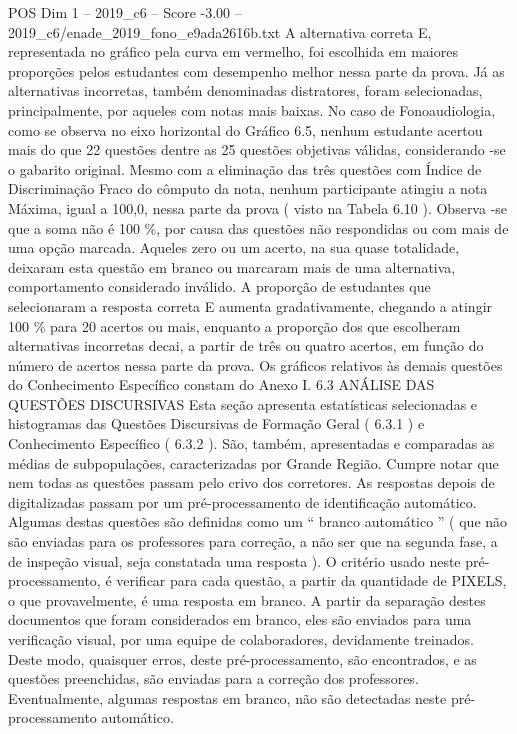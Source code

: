 \begin{textsample}{POS Dim 1 – 2019\_c6 – Score -3.00 – 2019\_c6/enade\_2019\_fono\_e9ada2616b.txt}
A alternativa correta E, representada no gráfico pela curva em vermelho, foi escolhida em maiores proporções pelos estudantes com desempenho melhor nessa parte da prova.
Já as alternativas incorretas, também denominadas distratores, foram selecionadas, principalmente, por aqueles com notas mais baixas.
No caso de Fonoaudiologia, como se observa no eixo horizontal do Gráfico 6.5, nenhum estudante acertou mais do que 22 questões dentre as 25 questões objetivas válidas, considerando -se o gabarito original.
Mesmo com a eliminação das três questões com Índice de Discriminação Fraco do cômputo da nota, nenhum participante atingiu a nota Máxima, igual a 100,0, nessa parte da prova ( visto na Tabela 6.10 ).
Observa -se que a soma não é 100 \%, por causa das questões não respondidas ou com mais de uma opção marcada.
Aqueles zero ou um acerto, na sua quase totalidade, deixaram esta questão em branco ou marcaram mais de uma alternativa, comportamento considerado inválido.
A proporção de estudantes que selecionaram a resposta correta E aumenta gradativamente, chegando a atingir 100 \% para 20 acertos ou mais, enquanto a proporção dos que escolheram alternativas incorretas decai, a partir de três ou quatro acertos, em função do número de acertos nessa parte da prova.
Os gráficos relativos às demais questões do Conhecimento Específico constam do Anexo I. 6.3 ANÁLISE DAS QUESTÕES DISCURSIVAS Esta seção apresenta estatísticas selecionadas e histogramas das Questões Discursivas de Formação Geral ( 6.3.1 ) e Conhecimento Específico ( 6.3.2 ).
São, também, apresentadas e comparadas as médias de subpopulações, caracterizadas por Grande Região.
Cumpre notar que nem todas as questões passam pelo crivo dos corretores.
As respostas depois de digitalizadas passam por um pré-processamento de identificação automático.
Algumas destas questões são definidas como um “ branco automático ” ( que não são enviadas para os professores para correção, a não ser que na segunda fase, a de inspeção visual, seja constatada uma resposta ).
O critério usado neste pré-processamento, é verificar para cada questão, a partir da quantidade de PIXELS, o que provavelmente, é uma resposta em branco.
A partir da separação destes documentos que foram considerados em branco, eles são enviados para uma verificação visual, por uma equipe de colaboradores, devidamente treinados.
Deste modo, quaisquer erros, deste pré-processamento, são encontrados, e as questões preenchidas, são enviadas para a correção dos professores.
Eventualmente, algumas respostas em branco, não são detectadas neste pré-processamento automático.

\end{textsample}
